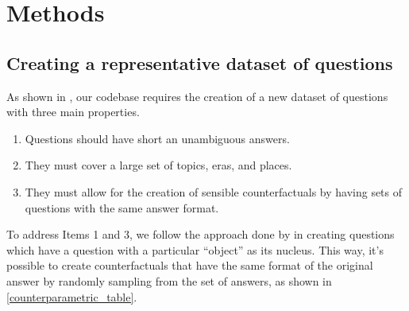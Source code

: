\section{Methods}

\subsection{Creating a representative dataset of questions}
\label{creating_dataset}

As shown in , our codebase requires the creation of a new dataset of questions with three main properties.

\begin{enumerate}
	\item Questions should have short an unambiguous answers. \label{q_short}
	\item They must cover a large set of topics, eras, and places. \label{q_widespread}
	\item They must allow for the creation of sensible counterfactuals by having sets of questions with the same answer format. \label{q_counterfactual}
\end{enumerate}

To address Items 1 and 3, we follow the approach done by \citeauthor{factual_recall} in creating questions which have a question with a particular ``object'' as its nucleus.
This way, it's possible to create counterfactuals that have the same format of the original answer by randomly sampling from the set of answers, as shown in \cref{counterparametric_table}.

